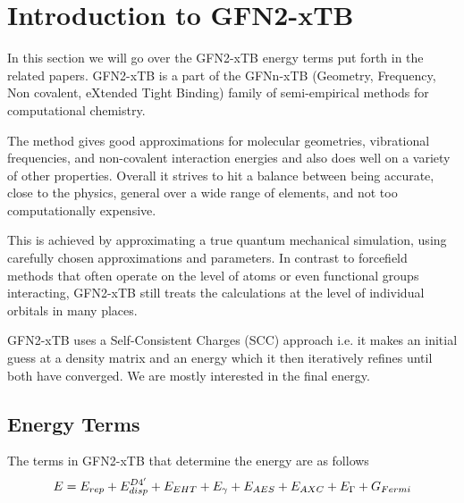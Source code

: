 \chapter{Introduction to GFN2-xTB}\label{sec:gfn2}
In this section we will go over the GFN2-xTB energy terms put forth in the related papers\cite{grimme2017,bannwarth2019,bannwarth2021}.
GFN2-xTB is a part of the GFNn-xTB (Geometry, Frequency, Non covalent, eXtended Tight Binding) family of semi-empirical methods for computational chemistry. 

The method gives good approximations for molecular geometries, vibrational frequencies, and non-covalent interaction energies and also does well on a variety of other properties. 
Overall it strives to hit a balance between being accurate, close to the physics, general over a wide range of elements, and not too computationally expensive.

This is achieved by approximating a true quantum mechanical simulation, using carefully chosen approximations and parameters. 
In contrast to forcefield methods that often operate on the level of atoms or even functional groups interacting, GFN2-xTB still treats the calculations at the level of individual orbitals in many places. 

GFN2-xTB uses a Self-Consistent Charges (SCC) approach i.e. it makes an initial guess at a density matrix and an energy which it then iteratively refines until both have converged. We are mostly interested in the final energy. 

\section{Energy Terms}
The terms in GFN2-xTB that determine the energy are as follows
\begin{equation}
        E =\E{rep}+\E{disp}^{D4'}+\E{EHT}+\E{\gamma}+\E{AES}+\E{AXC}+\E{\Gamma} + G_{Fermi} \label{eq:gfn2-energies}
\end{equation}

